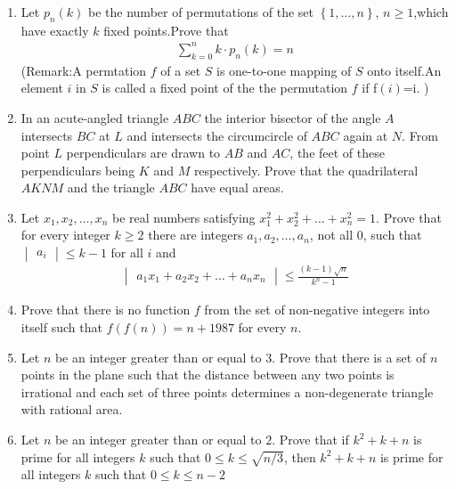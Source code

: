 \documentclass[12pt,-letter paper]{article}
\providecommand{\mydet}[1]{\ensuremath{\begin{vmatrix}#1\end{vmatrix}}}
\providecommand{\cbrak}[1]{\ensuremath{\left\{#1\right\}}}
\providecommand{\brak}[1]{\ensuremath{\left(#1\right)}}
\begin{document}
   \begin{enumerate}
  
	   \item Let $p_n \brak{k}$ be the number of permutations of the set $\cbrak{1,\dots,n}$, $n\geq1$,which have exactly $k$ fixed points.Prove that \\
	   \begin{align*}   \sum_{k=0}^{n} k \cdot p_n\brak{k} = n 
	   \end{align*} 
		   (Remark:A permtation $f$ of a set $S$ is one-to-one mapping of $S$ onto itself.An element $i$ in $S$ is called a fixed point of the the permutation $f$ if f\brak{i}=i. )
   
	   \item In an acute-angled triangle $ABC$ the interior bisector of the angle $A$ intersects $BC$ at $L$ and intersects the circumcircle of $ABC$ again at $N$. From point $L$ perpendiculars are drawn to $AB$ and $AC$, the feet of these perpendiculars being $K$ and $M$ respectively. Prove that the quadrilateral $AKNM$ and the triangle $ABC$ have equal areas.
	 
	   \item Let $x_1, x_2, \dots, x_n$ be real numbers satisfying $x^2_1 +x^2_2 +\dots +x^2_n = 1$. Prove that for every integer $k\geq2$ there are integers $a_1, a_2, \dots , a_n$, not all $0$, such that $\mydet{a_i}\leq k-1$ for all $i$ and \\
		   \begin{align*} \mydet{a_1x_1+a_2x_2+\dots+a_nx_n} \leq \frac{\brak{k-1}\sqrt{n}}{k^n-1} \end{align*}
		   
           \item Prove that there is no function $f$ from the set of non-negative integers into itself such that $f\brak{f\brak{n}}=n+1987$ for every $n$.

	  \item Let $n$ be an integer greater than or equal to $3$. Prove that there is a set of $n$ points in the plane such that the distance between any two points is irrational and each set of three points determines a non-degenerate triangle with rational area.


	  \item Let $n$ be an integer greater than or equal to $2$. Prove that if $k^2+k+n$ is prime for all integers $k$ such that $0\leq k\leq \sqrt{n/3}$, then $k^2+k+n$ is prime for all integers $k$ such that $0\leq k\leq n-2$ 
		



   \end{enumerate}
   
\end{document}
